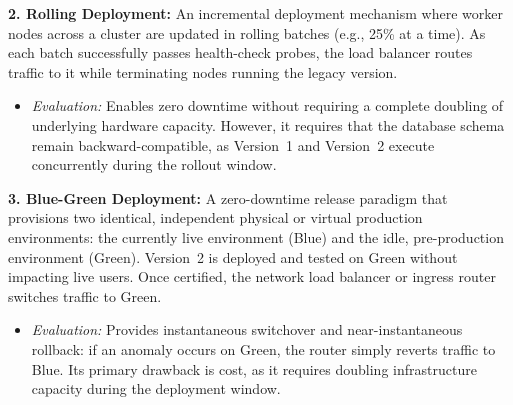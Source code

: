 \documentclass[11pt,a4paper]{article}
\begin{document}
\textbf{2. Rolling Deployment:} An incremental deployment mechanism where worker nodes across a cluster are updated in rolling batches (e.g., 25\% at a time). As each batch successfully passes health-check probes, the load balancer routes traffic to it while terminating nodes running the legacy version.
\begin{itemize}
    \item \textit{Evaluation:} Enables zero downtime without requiring a complete doubling of underlying hardware capacity. However, it requires that the database schema remain backward-compatible, as Version~1 and Version~2 execute concurrently during the rollout window.
\end{itemize}

\textbf{3. Blue-Green Deployment:} A zero-downtime release paradigm that provisions two identical, independent physical or virtual production environments: the currently live environment (Blue) and the idle, pre-production environment (Green). Version~2 is deployed and tested on Green without impacting live users. Once certified, the network load balancer or ingress router switches traffic to Green.
\begin{itemize}
    \item \textit{Evaluation:} Provides instantaneous switchover and near-instantaneous rollback: if an anomaly occurs on Green, the router simply reverts traffic to Blue. Its primary drawback is cost, as it requires doubling infrastructure capacity during the deployment window.
\end{itemize}
\end{document}
